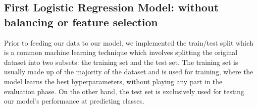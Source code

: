 \documentclass[
]{article}
\begin{document}
\hypertarget{first-logistic-regression-model-without-balancing-or-feature-selection}{%
\subsection{First Logistic Regression Model: without balancing or
feature
selection}\label{first-logistic-regression-model-without-balancing-or-feature-selection}}

Prior to feeding our data to our model, we implemented the train/test
split which is a common machine learning technique which involves
splitting the original dataset into two subsets: the training set and
the test set. The training set is usually made up of the majority of the
dataset and is used for training, where the model learns the best
hyperparameters, without playing any part in the evaluation phase. On
the other hand, the test set is exclusively used for testing our model's
performance at predicting classes.
\end{document}
